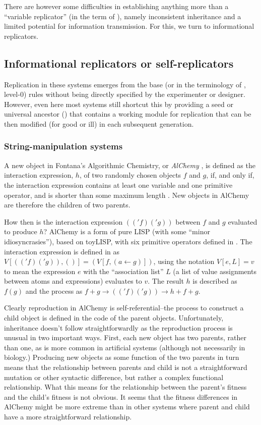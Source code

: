 There are however some difficulties in establishing anything more than a ``variable replicator'' (in the term of \textcite{Zachar2010}), namely inconsistent inheritance and a limited potential for information transmission. For this, we turn to informational replicators.

\subsection{Informational replicators or self-replicators}
Replication in these systems emerges from the base (or in the terminology of \textcite{BanzhafBaumgaertnerBeslonEtAl2016}, level-0) rules without being directly specified by the experimenter or designer. However, even here most systems still shortcut this by providing a seed or universal ancestor (\eg \textcite{Ofria2004}) that contains a working module for replication that can be then modified (for good or ill) in each subsequent generation.

\subsubsection{String-manipulation systems}

A new object in Fontana's Algorithmic Chemistry, or \emph{AlChemy} \parencite{Fontana1992}, is defined as the interaction expression, $h$, of two randomly chosen objects $f$ and $g$, if, and only if, the interaction expression contains at least one variable and one primitive operator, and is shorter than some maximum length \parencite[p.173--p.180]{Fontana1992}. New objects in AlChemy are therefore the children of two parents.

How then is the interaction expression $(('f)('g))$ between $f$ and $g$ evaluated to produce $h$? AlChemy is a form of pure LISP (with some ``minor idiosyncrasies''), based on toyLISP, with six primitive operators defined in \textcite[p.205]{Fontana1992}. The interaction expression is defined in \textcite[Definition A.9, p.204]{Fontana1992} as $V[(('f)('g)),()] = (V[f,(a\leftarrow g)])$, using the notation $V[e,L]=v$ to mean the expression $e$ with the ``association list'' $L$ (a list of value assignments between atoms and expressions) evaluates to $v$. The result $h$ is described as $f(g)$ and the process as $f+g \rightarrow (('f)('g)) \rightarrow h + f + g$.

Clearly reproduction in AlChemy is self-referential--the process to construct a child object is defined in the code of the parent objects. Unfortunately, inheritance doesn't follow straightforwardly as the reproduction process is unusual in two important ways. First, each new object has two parents, rather than one, as is more common in artificial systems (although not necessarily in biology.) Producing new objects as some function of the two parents in turn means that the relationship between parents and child is not a straightforward mutation or other syntactic difference, but rather a complex functional relationship. What this means for the relationship between the parent's fitness and the child's fitness is not obvious. It seems that the fitness differences in AlChemy might be more extreme than in other systems where parent and child have a more straightforward relationship.

